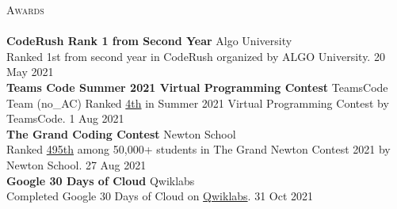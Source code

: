 \documentclass[a4paper]{article}
\newcommand{\lineunder} {
    \vspace*{-8pt} \\
    \hspace*{-18pt} \hrulefill \\
}
\newcommand{\header} [1] {
    {\hspace*{-18pt}\vspace*{6pt} \textsc{#1}}
    \vspace*{-6pt} \lineunder
}
\begin{document}
\header{Awards}
\textbf{CodeRush Rank 1 from Second Year} \hfill Algo University\\
Ranked 1st from second year in CodeRush organized by ALGO University. \hfill 20 May 2021\\
\vspace*{2mm}
\textbf{Teams Code Summer 2021 Virtual Programming Contest} \hfill TeamsCode\\
Team (no\_AC) Ranked \href{https://youtu.be/eCylTCHctY0?t=16137}{4th} in Summer 2021 Virtual Programming Contest by TeamsCode. \hfill 1 Aug 2021\\
\vspace*{2mm}
\textbf{The Grand Coding Contest} \hfill Newton School\\
Ranked \href{https://www.linkedin.com/posts/aryanpathania03_aryan-has-secured-rank-495-in-newtons-grand-activity-6841777869484642304-YhKD}{495th} among 50,000+ students in The Grand Newton Contest 2021 by Newton School. \hfill 27 Aug 2021\\
\vspace*{2mm}
\textbf{Google 30 Days of Cloud} \hfill Qwiklabs\\
Completed Google 30 Days of Cloud on \href{https://www.qwiklabs.com/public_profiles/4c78c6d8-ad43-4991-b8fe-03e559c1bac5}{Qwiklabs}. \hfill 31 Oct 2021\\
\vspace*{2mm}

\
\end{document}
